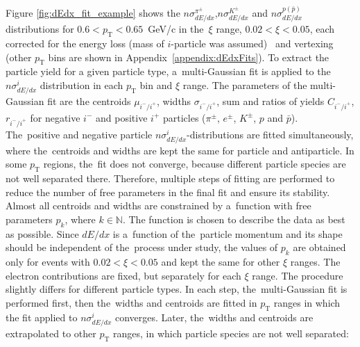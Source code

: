\noindent Figure \ref{fig:dEdx_fit_example}
shows the $n\sigma^{\pi^\pm}_{dE/dx}$,$n\sigma^{K^\pm}_{dE/dx}$ and $n\sigma^{p(\bar{p})}_{dE/dx}$ distributions for  $0.6 < p_\textrm{T} < 0.65$~GeV/c  in the~$\xi$ range, $0.02 < \xi < 0.05$, each corrected for the energy loss (mass of $i$-particle was assumed)~\cite{supplementaryNote} and vertexing (other $p_\textrm{T}$ bins are shown in Appendix~\ref{appendix:dEdxFits}). To extract the  particle yield for a given particle type,
a~multi-Gaussian fit is applied to the $n\sigma^i_{dE/dx}$ distribution in each $p_\textrm{T}$ bin and $\xi$ range. The parameters of the multi-Gaussian fit are the centroids $\mu_{i^-/i^+}$, widths $\sigma_{i^-/i^+}$, sum  and ratios  of yields $C_{i^-/i^+}$, $r_{i^-/i^+}$ for negative $i^-$ and positive $i^+$ particles ($\pi^\pm$, $e^\pm$, $K^\pm$, $p$ and $\bar{p}$). The~positive and negative particle
$n\sigma^{i}_{dE/dx}$-distributions are fitted simultaneously, where the~centroids and widths are kept the same for particle
and antiparticle. 
In some $p_\textrm{T}$ regions, the~fit does not converge,
because different particle species are not well separated  there. Therefore, multiple steps of fitting are performed to reduce the number of free parameters in the final fit and ensure its stability. Almost all centroids and widths are constrained  by a~function with free parameters $p_k$, where $k \in \mathbb N$.  The function is chosen to describe the data as best as possible.
Since $dE/dx$ is a~function of the~particle momentum and its shape should be independent of the~process under study, the values of $p_k$  are obtained only for events with $0.02 < \xi < 0.05$ and kept the same for other $\xi$ ranges. The electron contributions are  fixed, but separately for each $\xi$ range. The procedure slightly differs for different particle types. In each step, the~multi-Gaussian fit is performed first, then the~widths and centroids are fitted  in  $p_\textrm{T}$ ranges in which the fit applied to $n\sigma^{i}_{dE/dx}$ converges. Later,  the~widths and centroids are extrapolated to other $p_\textrm{T}$ ranges, in which particle species are not well separated:
